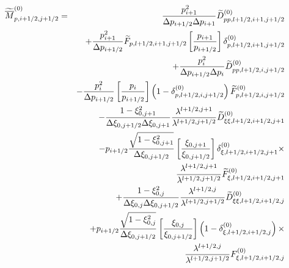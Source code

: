 \begin{eqnarray}
\widetilde{\overline{M}}_{p,i+1/2,j+1/2}^{\left( 0\right) } &=&\frac{%
p_{i+1}^{2}}{\Delta p_{i+1/2}\Delta p_{i+1}}\widetilde{D}%
_{pp,l+1/2,i+1,j+1/2}^{\left( 0\right) }  \nonumber \\
&&+\frac{p_{i+1}^{2}}{\Delta p_{i+1/2}}\widetilde{F}_{p,l+1/2,i+1,j+1/2}%
\left[ \frac{p_{i+1}}{p_{i+1/2}}\right] \delta _{p,l+1/2,i+1,j+1/2}^{\left(
0\right) }  \nonumber \\
&&+\frac{p_{i}^{2}}{\Delta p_{i+1/2}\Delta p_{i}}\widetilde{D}%
_{pp,l+1/2,i,j+1/2}^{\left( 0\right) }  \nonumber \\
&&-\frac{p_{i}^{2}}{\Delta p_{i+1/2}}\left[ \frac{p_{i}}{p_{i+1/2}}\right]
\left( 1-\delta _{p,l+1/2,i,j+1/2}^{\left( 0\right) }\right) \widetilde{F}%
_{p,l+1/2,i,j+1/2}^{\left( 0\right) }  \nonumber \\
&&-\frac{1-\xi _{0,j+1}^{2}}{\Delta \xi _{0,j+1/2}\Delta \xi _{0,j+1}}\frac{%
\lambda ^{l+1/2,j+1}}{\lambda ^{l+1/2,j+1/2}}\widetilde{D}_{\xi \xi
,l+1/2,i+1/2,j+1}^{\left( 0\right) }  \nonumber \\
&&-p_{i+1/2}\frac{\sqrt{1-\xi _{0,j+1}^{2}}}{\Delta \xi _{0,j+1/2}}\left[
\frac{\xi _{0,j+1}}{\xi _{0,j+1/2}}\right] \delta _{\xi
,l+1/2,i+1/2,j+1}^{\left( 0\right) }\times   \nonumber \\
&&\frac{\lambda ^{l+1/2,j+1}}{\lambda ^{l+1/2,j+1/2}}\widetilde{F}_{\xi
,l+1/2,i+1/2,j+1}^{\left( 0\right) }  \nonumber \\
&&+\frac{1-\xi _{0,j}^{2}}{\Delta \xi _{0,j}\Delta \xi _{0,j+1/2}}\frac{%
\lambda ^{l+1/2,j}}{\lambda ^{l+1/2,j+1/2}}\widetilde{D}_{\xi \xi
,l+1/2,i+1/2,j}^{\left( 0\right) }  \nonumber \\
&&+p_{i+1/2}\frac{\sqrt{1-\xi _{0,j}^{2}}}{\Delta \xi _{0,j+1/2}}\left[
\frac{\xi _{0,j}}{\xi _{0,j+1/2}}\right] \left( 1-\delta _{\xi
,l+1/2,i+1/2,j}^{\left( 0\right) }\right) \times   \nonumber \\
&&\frac{\lambda ^{l+1/2,j}}{\lambda ^{l+1/2,j+1/2}}F_{\xi
,l+1/2,i+1/2,j}^{\left( 0\right) }\nonumber \\
\end{eqnarray}
